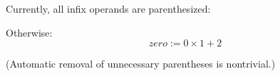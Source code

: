 \documentclass{led_doc}
\begin{document}
\begin{ledCmnt}
Currently, all infix operands are parenthesized:
\end{ledCmnt}

\begin{ledDef}
\end{ledDef}

\begin{ledCmnt}
Otherwise:
$$ zero := 0 \times 1 + 2 $$

(Automatic removal of unnecessary parentheses is nontrivial.)
\end{ledCmnt}
\end{document}
